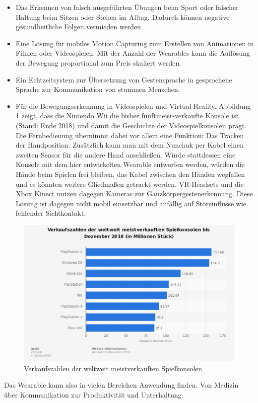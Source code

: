 \begin{itemize}
  \item Das Erkennen von falsch ausgeführten Übungen beim Sport oder falscher Haltung beim Sitzen oder Stehen im Alltag.
	Dadurch können negative gesundheitliche Folgen vermieden werden.
  \item Eine Lösung für mobiles Motion Capturing zum Erstellen von Animationen in Filmen oder Videospielen.
	Mit der Anzahl der Wearables kann die Auflösung der Bewegung proportional zum Preis skaliert werden.
  \item Ein Echtzeitsystem zur Übersetzung von Gestensprache in gesprochene Sprache zur Kommunikation von stummen Menschen.
  \item Für die Bewegungserkennung in Videospielen und Virtual Reality.
	Abbildung \ref{fig:stat_konsolen} zeigt, dass die Nintendo Wii die bisher fünftmeist-verkaufte Konsole ist (Stand: Ende 2018) und damit die Geschichte der Videospielkonsolen prägt.
	Die Fernbedienung übernimmt dabei vor allem eine Funktion: Das Tracken der Handposition.
	Zusätzlich kann man mit dem Nunchuk per Kabel einen zweiten Sensor für die andere Hand anschließen.
	Würde stattdessen eine Konsole mit dem hier entwickelten Wearable entworfen werden, würden die Hände beim Spielen frei bleiben, das Kabel zwischen den Händen wegfallen und es könnten weitere Gliedmaßen getrackt werden.
	VR-Headsets und die Xbox Kinect nutzen dagegen Kameras zur Ganzkörpergestenerkennung.
	Diese Lösung ist dagegen nicht mobil einsetzbar und anfällig auf Störeinflüsse wie fehlender Sichtkontakt.
\end{itemize}
\begin{figure}[hbtp]
  \centering
  \includegraphics[width=0.75\linewidth]{res/01_statistic_id160549_weltweit-meistverkaufte-spielkonsolen-bis-dezember-2018.png}
  \caption{Verkaufszahlen der weltweit meistverkauften Spielkonsolen \cite{statistik_konsolen}}
  \label{fig:stat_konsolen}
\end{figure}
Das Wearable kann also in vielen Bereichen Anwendung finden. Von Medizin über Kommunikation zur Produktivität und Unterhaltung.

